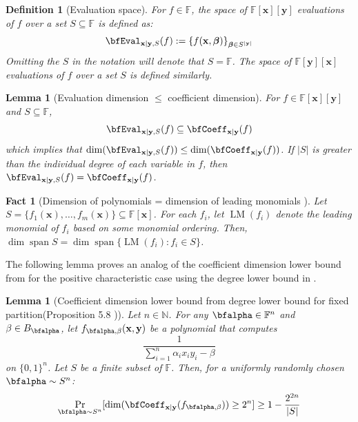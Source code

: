 \documentclass[11pt]{article}
\newtheorem{lemma}[theorem]{Lemma}
\newtheorem{definition}[theorem]{Definition}
\newtheorem{fact}[theorem]{Fact}
\newcommand{\Boo}{\{0,1 \}}
\newcommand{\F}{\mathbb{F}}
\begin{document}
\begin{definition}[Evaluation space]
    For $f\in \F$, the \emph{space of $\F[\mathbf{x}][\mathbf{y}]$ evaluations of $f$ over a set $S\subseteq \F$} is defined as: $$ \bfEval_{\mathbf{x}|\mathbf{y},S}(f) := \left\{ f(\mathbf{x},\boldsymbol{\beta}) \right\}_{\boldsymbol{\beta}\in S^{|\mathbf{y}|}}$$ 
    Omitting the $S$ in the notation will denote that $S = \F$. The \emph{space of $\F[\mathbf{y}][\mathbf{x}]$ evaluations of $f$ over a set $S$} is defined similarly. 
\end{definition}

\begin{lemma}[Evaluation dimension $\leq$ coefficient dimension]\label{lem:coeff vs eval}
    For $f\in \F[\mathbf{x}][\mathbf{y}]$ and $S\subseteq \F$, $$\bfEval_{\mathbf{x}|\mathbf{y},S}(f) \subseteq \bfCoeff_{\mathbf{x}|\mathbf{y}}(f)$$ which implies that $\dim(\bfEval_{\mathbf{x}|\mathbf{y},S}(f)) \leq \dim(\bfCoeff_{\mathbf{x}|\mathbf{y}}(f))$. If $|S|$ is greater than the individual degree of each variable in $f$, then $\bfEval_{\mathbf{x}|\mathbf{y},S}(f) = \bfCoeff_{\mathbf{x}|\mathbf{y}}(f)$.
\end{lemma}

\begin{fact}[Dimension of polynomials = dimension of leading monomials \cite{Forbes-thesis}]\label{fact:dim of leading monomials}
    Let $S = \{f_1(\mathbf{x}), \dots, f_m(\mathbf{x})\} \subseteq \F[\mathbf{x}]$. For each $f_i$, let $\operatorname{LM}(f_i)$ denote the leading monomial of $f_i$ based on some monomial ordering. Then, $\dim \operatorname{span} S = \dim \operatorname{span}\{\operatorname{LM}(f_i): f_i \in S\}$.
\end{fact}

The following lemma proves an analog of the coefficient dimension lower bound from \cite{FSTW21} for the positive characteristic case using the degree lower bound in .

\begin{lemma}[Coefficient dimension lower bound from degree lower bound for fixed partition(Proposition 5.8 \cite{FSTW21})]\label{lem: fixed partition coeff dim lbd}
    Let $n\in \mathbb{N}$. For any $\bfalpha \in \F^n$ and $\beta \in B_{\bfalpha}$, let $f_{\bfalpha,\beta}(\mathbf{x},\mathbf{y})$ be a polynomial that computes $$\frac{1}{\sum_{i=1}^n \alpha_i x_iy_i - \beta}$$ on $\Boo^n$. Let $S$ be a finite subset of $\F$. Then, for a uniformly randomly chosen $\bfalpha \sim S^n$: $$ \Pr_{\bfalpha \sim S^n}[\dim (\bfCoeff_{\mathbf{x}|\mathbf{y}}(f_{\bfalpha,\beta})) \geq 2^n] \geq 1-\frac{2^{2n}}{|S|} $$
\end{lemma}
\end{document}

